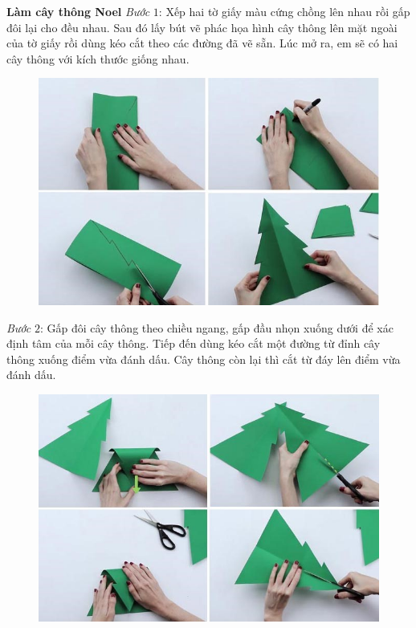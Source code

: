 \begin{multicols}{2}
	\vskip 0.1cm
	\textbf{\color{toancuabi}Làm cây thông Noel}
	\vskip 0.1cm
	\textit{Bước} $1$: Xếp hai tờ giấy màu cứng chồng lên nhau rồi gấp đôi lại cho đều nhau. Sau đó lấy bút vẽ phác họa hình cây thông lên mặt ngoài của tờ giấy rồi dùng kéo cắt theo các đường đã vẽ sẵn. Lúc mở ra, em sẽ có hai cây thông với kích thước giống nhau.
	\begin{figure}[H]
		\vspace*{-5pt}
		\centering
		\captionsetup{labelformat= empty, justification=centering}
		\includegraphics[width= 1\linewidth]{6}
		\vspace*{-15pt}
	\end{figure}
	\textit{Bước} $2$: Gấp đôi cây thông theo chiều ngang, gấp đầu nhọn xuống dưới để xác định tâm của mỗi cây thông. Tiếp đến dùng kéo cắt một đường từ đỉnh cây thông xuống điểm vừa đánh dấu. Cây thông còn lại thì cắt từ đáy lên điểm vừa đánh dấu.
	\begin{figure}[H]
		\vspace*{5pt}
		\centering
		\captionsetup{labelformat= empty, justification=centering}
		\includegraphics[width= 1\linewidth]{7}

\end{figure}
\end{multicols}
